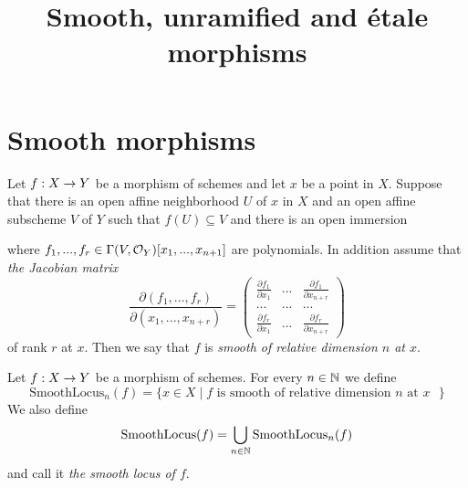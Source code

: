 



\title{Smooth, unramified and {\'e}tale morphisms}
\date{}
\maketitle

\section{Smooth morphisms}

\begin{definition}
Let $f:X\rightarrow Y$ be a morphism of schemes and let $x$ be a point in $X$. Suppose that there is an open affine neighborhood $U$ of $x$ in $X$ and an open affine subscheme $V$ of $Y$ such that $f(U)\subseteq V$ and there is an open immersion
\begin{center}
\end{center}
where $f_1,...,f_r \in \Gamma(V,{\mathcal O}_Y)[x_1,...,x_{n+1}]$ are polynomials. In addition assume that \textit{the Jacobian matrix} 
$$ \frac{\partial(f_1,...,f_r)}{\partial(x_1,...,x_{n+r})} = \begin{pmatrix}
\frac{\partial f_1}{\partial x_1} & ... & \frac{\partial f_1}{\partial x_{n+r}} \\
... &...  &...  \\
\frac{\partial f_r}{\partial x_{1}} &...  & \frac{\partial f_r}{\partial x_{n+r}}\end{pmatrix}$$
of rank $r$ at $x$. Then we say that $f$ is \textit{smooth of relative dimension $n$ at $x$}.
\end{definition}

\begin{definition}
Let $f:X\rightarrow Y$ be a morphism of schemes. For every $n\in {\mathbb N}$ we define
$$\mathrm{SmoothLocus}_n(f) = \big\{x\in X\mid \mbox{$f$ is smooth of relative dimension $n$ at $x$ }\big\}$$
We also define
$$\mathrm{SmoothLocus}(f) = \bigcup_{n\in {\mathbb N}}\mathrm{SmoothLocus}_n(f)$$
and call it \textit{the smooth locus of $f$}.
\end{definition}

